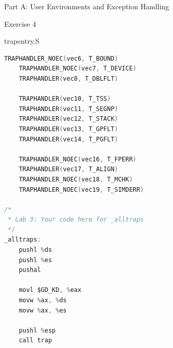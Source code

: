 \documentclass[GBK,winfonts,a4paper,10pt]{ctexart}
\begin{document}
\begin{section}{ Part A: User Environments and Exception Handling }
\begin{subsection}{ Exercise 4 }
\begin{subsubsection}{ trapentry.S }
\begin{lstlisting}[language=C]
 	TRAPHANDLER_NOEC(vec6, T_BOUND)
	TRAPHANDLER_NOEC(vec7, T_DEVICE)
 	TRAPHANDLER(vec8, T_DBLFLT)

 	TRAPHANDLER(vec10, T_TSS)
 	TRAPHANDLER(vec11, T_SEGNP)
 	TRAPHANDLER(vec12, T_STACK)
 	TRAPHANDLER(vec13, T_GPFLT)
 	TRAPHANDLER(vec14, T_PGFLT) 

 	TRAPHANDLER_NOEC(vec16, T_FPERR)
 	TRAPHANDLER(vec17, T_ALIGN)
 	TRAPHANDLER_NOEC(vec18, T_MCHK)
 	TRAPHANDLER_NOEC(vec19, T_SIMDERR)

/*
 * Lab 3: Your code here for _alltraps
 */
_alltraps:
	pushl %ds
	pushl %es
	pushal

	movl $GD_KD, %eax
	movw %ax, %ds
	movw %ax, %es

	pushl %esp
	call trap
\end{lstlisting}
\end{subsubsection}


\end{subsection}
\end{section}
\end{document}
